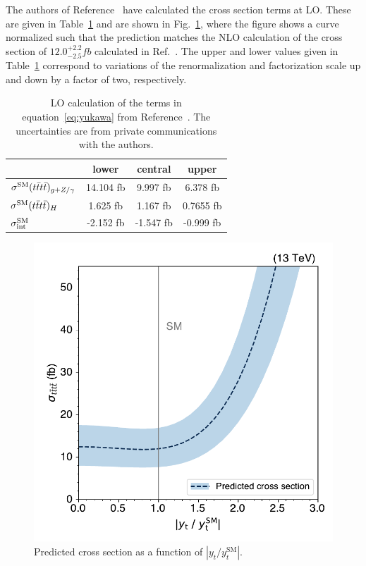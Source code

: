 The authors of Reference~\cite{THEORY:TopYukawaTTTT} have calculated the cross section terms at LO.
These are given in Table~\ref{tab:yukawa} and are shown in Fig.~\ref{fig:cross_section_yt},
where the figure shows a curve normalized such that the prediction matches the NLO calculation of 
the \tttt cross section of $12.0^{+2.2}_{-2.5}\unit{fb}$ calculated in Ref.~\cite{THEORY:Frederix2017wme}.
The upper and lower values given in Table~\ref{tab:yukawa} correspond to variations
of the renormalization and factorization scale up and down by a factor of two, respectively.

\begin{table} [h!]
\begin{center}
{\renewcommand{\arraystretch}{1.3}
\begin{tabular}{l|ccc}
\hline
   & lower & central & upper \\
\hline
$ \sigma^{\text{SM}}(t\bar{t}t\bar{t})_{g+Z/\gamma}  $ & 14.104 fb & 9.997 fb &  6.378 fb \\
$ \sigma^{\text{SM}}(t\bar{t}t\bar{t})_H $                  & 1.625 fb &  1.167 fb &  0.7655 fb \\
$\sigma^{\text{SM}}_{\rm int} $                   & -2.152 fb &  -1.547 fb &  -0.999 fb \\
\hline
\end{tabular}}
\caption{LO calculation of the terms in equation~\ref{eq:yukawa} from
Reference~\cite{THEORY:TopYukawaTTTT}.  
The uncertainties are from private communications with the authors.}
\label{tab:yukawa}
\end{center}
\end{table}


\begin{figure}[!htbp]
    \centering
    \includegraphics[width=0.75\linewidth]{figs/ftan/cross_section_yt.pdf}
    \caption{
        Predicted \tttt cross section as a function of $|y_t/y_t^{\text{SM}}|$.
    }
    \label{fig:cross_section_yt}
\end{figure}

